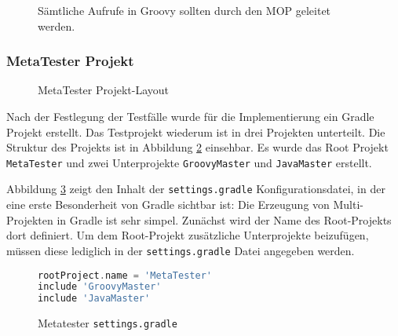 \begin{figure}[hbt!]
	\centering
	
	\caption{Sämtliche Aufrufe in Groovy sollten durch den MOP geleitet werden.}
	\label{fig:meta-mop}
\end{figure}


\subsubsection{MetaTester Projekt}


\begin{figure} [hbt!]
\centering
\begin{minipage}{10cm}
\end{minipage}
	\caption{MetaTester Projekt-Layout}
	\label{fig:meta-tester}
\end{figure}


Nach der Festlegung der Testfälle wurde für die Implementierung ein Gradle Projekt erstellt. 
Das Testprojekt wiederum ist in drei Projekten unterteilt. 
Die Struktur des Projekts ist in Abbildung \ref{fig:meta-tester} einsehbar. 
Es wurde das Root Projekt \texttt{MetaTester} und zwei Unterprojekte \texttt{GroovyMaster} und \texttt{JavaMaster} erstellt. 

Abbildung \ref{fig:mt-settings.gradle} zeigt den Inhalt der \texttt{settings.gradle} Konfigurationsdatei, in der eine erste Besonderheit von Gradle sichtbar ist:
Die Erzeugung von Multi-Projekten in Gradle ist sehr simpel.
Zunächst wird der Name des Root-Projekts dort definiert. 
Um dem Root-Projekt zusätzliche Unterprojekte beizufügen, müssen diese lediglich in der \texttt{settings.gradle} Datei angegeben werden. 


\begin{figure}[hbt!]
\begin{lstlisting}[frame=none, language=groovy]
rootProject.name = 'MetaTester'
include 'GroovyMaster'
include 'JavaMaster'
\end{lstlisting}
\caption{Metatester \texttt{settings.gradle}}
\label{fig:mt-settings.gradle}
\end{figure}


